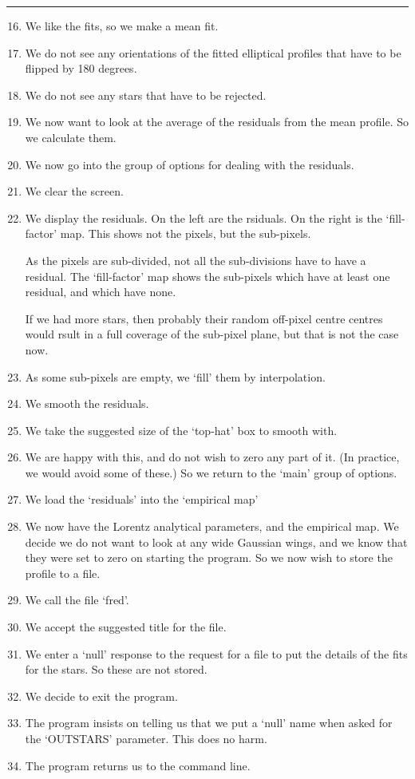 \begin{small}
{{ 
\vspace*{3mm}
\hspace*{13mm}\rule{5in}{0.25mm}
\vspace*{1mm}

\begin{enumerate}
\setcounter{enumi}{15}
\item We like the fits, so we make a mean fit.
\item We do not see any orientations of the fitted elliptical profiles
      that have to be flipped by 180 degrees.
\item We do not see any stars that have to be rejected.
\item We now want to look at the average of the residuals from the
      mean profile. So we calculate them.
\item We now go into the group of options for dealing with the
      residuals.
\item We clear the screen.
\item We display the residuals. On the left are the rsiduals. On the
      right is the `fill-factor' map. This shows not the pixels, but the
      sub-pixels.
 
      As the pixels are sub-divided, not all the sub-divisions have to
      have a residual. The `fill-factor' map shows the sub-pixels which
      have at least one residual, and which have none.
 
      If we had more stars, then probably their random off-pixel centre
      centres would rsult in a full coverage of the sub-pixel plane, but
      that is not the case now.
\item As some sub-pixels are empty, we `fill' them by interpolation.
\item We smooth the residuals.
\item We take the suggested size of the `top-hat' box to smooth with.
\item We are happy with this, and do not wish to zero any part of it.
      (In practice, we would avoid some of these.) So we return to
      the `main' group of options.
\item We load the `residuals' into the `empirical map'
\item We now have the Lorentz analytical parameters, and the empirical
      map. We decide we do not want to look at any wide Gaussian wings,
      and we know that they were set to zero on starting the program.
      So we now wish to store the profile to a file.
\item We call the file `fred'.
\item We accept the suggested title for the file.
\item We enter a `null' response to the request for a file to put
      the details of the fits for the stars. So these are not stored.
\item We decide to exit the program.
\item The program insists on telling us that we put a `null' name
      when asked for the `OUTSTARS' parameter. This does no harm.
\item The program returns us to the command line.
\end{enumerate}
 
}}
\end{small}
